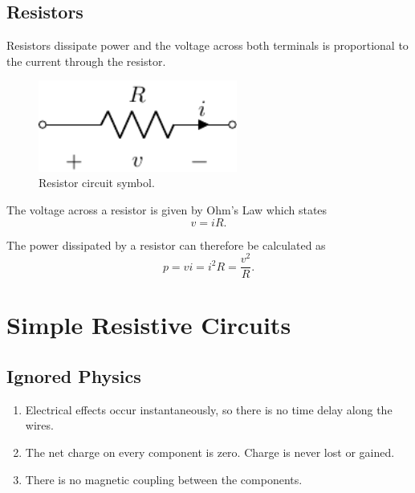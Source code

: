 \documentclass{article}
\begin{document}
\subsection{Resistors}
\begin{definition}[Resistor]
    Resistors dissipate power and the voltage across both terminals is proportional to the current through the resistor.
\end{definition}
\begin{figure}[H]
    \centering
    \includegraphics[height = 3cm, keepaspectratio = true]{figures/resistor.pdf}
    \caption{Resistor circuit symbol.}
\end{figure}
\begin{theorem}
    The voltage across a resistor is given by Ohm's Law which states
    \begin{equation*}
        v = iR.
    \end{equation*}
\end{theorem}
\begin{corollary}
    The power dissipated by a resistor can therefore be calculated as
    \begin{equation*}
        p = vi = i^2 R = \frac{v^2}{R}.
    \end{equation*}
\end{corollary}
\newpage
\section{Simple Resistive Circuits}
\subsection{Ignored Physics}
\begin{enumerate}
    \item Electrical effects occur instantaneously, so there is no time
          delay along the wires.
    \item The net charge on every component is zero. Charge is never
          lost or gained.
    \item There is no magnetic coupling between the components.
\end{enumerate}
\end{document}
